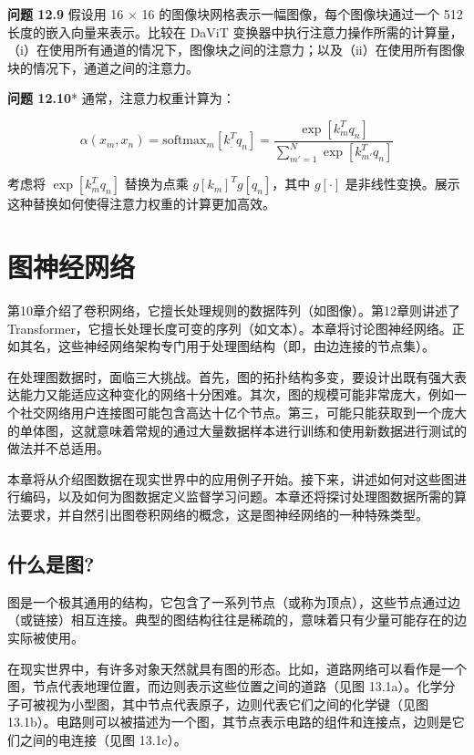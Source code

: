 \documentclass[lang=cn,newtx,10pt,scheme=chinese]{elegantbook}
\begin{document}
\textbf{问题 12.9} 假设用 16 × 16 的图像块网格表示一幅图像，每个图像块通过一个 512 长度的嵌入向量来表示。比较在 DaViT 变换器中执行注意力操作所需的计算量，（i）在使用所有通道的情况下，图像块之间的注意力；以及（ii）在使用所有图像块的情况下，通道之间的注意力。

\textbf{问题 12.10}* 通常，注意力权重计算为：

\begin{equation}
\alpha(x_m, x_n) = \text{softmax}_m [k_.^T q_n] = \frac{\exp[k_m^T q_n]}{\sum_{m'=1}^N \exp[k_{m'}^T q_n]} 
\end{equation}


考虑将 \(\exp \left[ k_m^T q_n \right]\) 替换为点乘 \(g[k_m]^T g[q_n]\)，其中 \(g[\cdot]\) 是非线性变换。展示这种替换如何使得注意力权重的计算更加高效。

\chapter{图神经网络}

第10章介绍了卷积网络，它擅长处理规则的数据阵列（如图像）。第12章则讲述了 Transformer，它擅长处理长度可变的序列（如文本）。本章将讨论图神经网络。正如其名，这些神经网络架构专门用于处理图结构（即，由边连接的节点集）。

在处理图数据时，面临三大挑战。首先，图的拓扑结构多变，要设计出既有强大表达能力又能适应这种变化的网络十分困难。其次，图的规模可能非常庞大，例如一个社交网络用户连接图可能包含高达十亿个节点。第三，可能只能获取到一个庞大的单体图，这就意味着常规的通过大量数据样本进行训练和使用新数据进行测试的做法并不总适用。

本章将从介绍图数据在现实世界中的应用例子开始。接下来，讲述如何对这些图进行编码，以及如何为图数据定义监督学习问题。本章还将探讨处理图数据所需的算法要求，并自然引出图卷积网络的概念，这是图神经网络的一种特殊类型。
\section{什么是图?}
图是一个极其通用的结构，它包含了一系列节点（或称为顶点），这些节点通过边（或链接）相互连接。典型的图结构往往是稀疏的，意味着只有少量可能存在的边实际被使用。

在现实世界中，有许多对象天然就具有图的形态。比如，道路网络可以看作是一个图，节点代表地理位置，而边则表示这些位置之间的道路（见图 13.1a）。化学分子可被视为小型图，其中节点代表原子，边则代表它们之间的化学键（见图 13.1b）。电路则可以被描述为一个图，其节点表示电路的组件和连接点，边则是它们之间的电连接（见图 13.1c）。
\end{document}
